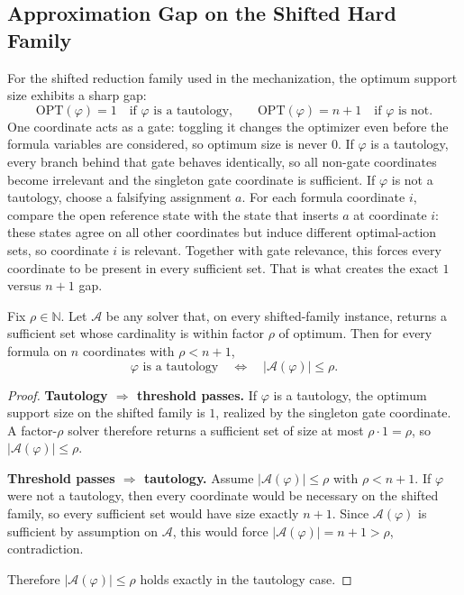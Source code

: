 \subsection{Approximation Gap on the Shifted Hard Family}

For the shifted reduction family used in the mechanization, the optimum support size exhibits a sharp gap:
\[
\mathrm{OPT}(\varphi)=1 \quad \text{if $\varphi$ is a tautology,}
\qquad
\mathrm{OPT}(\varphi)=n+1 \quad \text{if $\varphi$ is not.}
\]
One coordinate acts as a gate: toggling it changes the optimizer even before the formula variables are considered, so optimum size is never $0$. If $\varphi$ is a tautology, every branch behind that gate behaves identically, so all non-gate coordinates become irrelevant and the singleton gate coordinate is sufficient. If $\varphi$ is not a tautology, choose a falsifying assignment $a$. For each formula coordinate $i$, compare the open reference state with the state that inserts $a$ at coordinate $i$: these states agree on all other coordinates but induce different optimal-action sets, so coordinate $i$ is relevant. Together with gate relevance, this forces every coordinate to be present in every sufficient set. That is what creates the exact $1$ versus $n+1$ gap.

\begin{theorem}
Fix $\rho\in\mathbb{N}$. Let $\mathcal{A}$ be any solver that, on every shifted-family instance, returns a sufficient set whose cardinality is within factor $\rho$ of optimum. Then for every formula on $n$ coordinates with $\rho<n+1$,
\[
\varphi \text{ is a tautology}
\quad\Longleftrightarrow\quad
|\mathcal{A}(\varphi)|\le \rho.
\]
\end{theorem}

\begin{proof}
\textbf{Tautology $\Rightarrow$ threshold passes.}
If $\varphi$ is a tautology, the optimum support size on the shifted family is $1$, realized by the singleton gate coordinate. A factor-$\rho$ solver therefore returns a sufficient set of size at most $\rho\cdot 1=\rho$, so $|\mathcal{A}(\varphi)|\le \rho$.

\textbf{Threshold passes $\Rightarrow$ tautology.}
Assume $|\mathcal{A}(\varphi)|\le \rho$ with $\rho<n+1$. If $\varphi$ were not a tautology, then every coordinate would be necessary on the shifted family, so every sufficient set would have size exactly $n+1$. Since $\mathcal{A}(\varphi)$ is sufficient by assumption on $\mathcal{A}$, this would force $|\mathcal{A}(\varphi)|=n+1>\rho$, contradiction.

Therefore $|\mathcal{A}(\varphi)|\le \rho$ holds exactly in the tautology case.
\end{proof}

